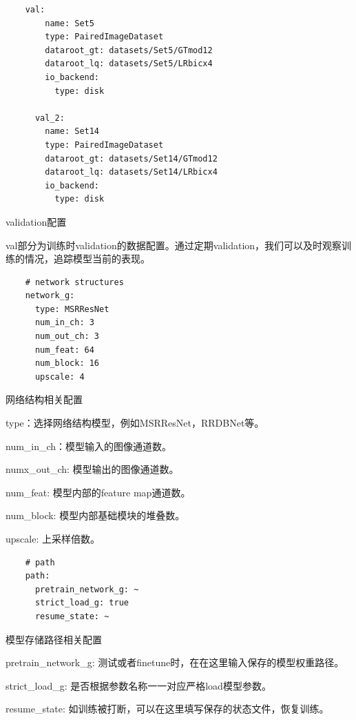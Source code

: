 \documentclass[../main.tex]{subfiles}
\begin{document}
    \begin{verbatim}
    val:
        name: Set5
        type: PairedImageDataset
        dataroot_gt: datasets/Set5/GTmod12
        dataroot_lq: datasets/Set5/LRbicx4
        io_backend:
          type: disk
    
      val_2:
        name: Set14
        type: PairedImageDataset
        dataroot_gt: datasets/Set14/GTmod12
        dataroot_lq: datasets/Set14/LRbicx4
        io_backend:
          type: disk
	\end{verbatim}
	\begin{exampleBox}[righthand ratio=0.00, sidebyside, sidebyside align=center, lower separated=false]{validation配置}
	
	val部分为训练时validation的数据配置。通过定期validation，我们可以及时观察训练的情况，追踪模型当前的表现。
    \end{exampleBox}
    \begin{verbatim}
    # network structures
    network_g:
      type: MSRResNet
      num_in_ch: 3
      num_out_ch: 3
      num_feat: 64
      num_block: 16
      upscale: 4
	\end{verbatim}
	\begin{exampleBox}[righthand ratio=0.00, sidebyside, sidebyside align=center, lower separated=false]{网络结构相关配置}
	
	type：选择网络结构模型，例如MSRResNet，RRDBNet等。
	
	num\_in\_ch：模型输入的图像通道数。
	
	numx\_out\_ch: 模型输出的图像通道数。
    
    num\_feat: 模型内部的feature map通道数。
    
    num\_block: 模型内部基础模块的堆叠数。
    
    upscale: 上采样倍数。
    \end{exampleBox}
    \begin{verbatim}
    # path
    path:
      pretrain_network_g: ~
      strict_load_g: true
      resume_state: ~
	\end{verbatim}
	\begin{exampleBox}[righthand ratio=0.00, sidebyside, sidebyside align=center, lower separated=false]{模型存储路径相关配置}
	
	pretrain\_network\_g: 测试或者finetune时，在在这里输入保存的模型权重路径。
	
    strict\_load\_g: 是否根据参数名称一一对应严格load模型参数。
    
    resume\_state: 如训练被打断，可以在这里填写保存的状态文件，恢复训练。
    \end{exampleBox}
\end{document}
